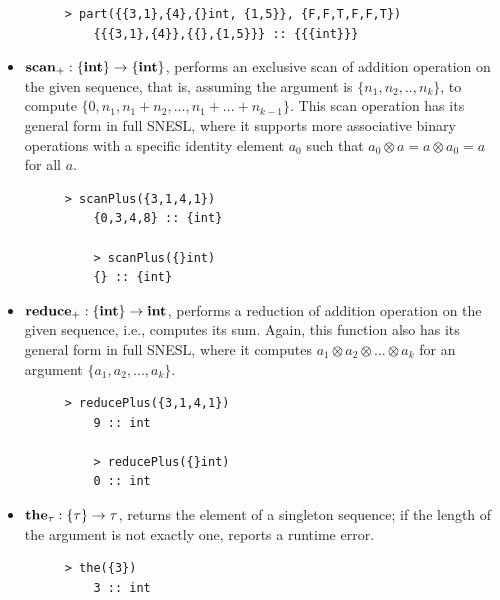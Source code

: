 \begin{itemize}
\begin{figure}[H]
\begin{lstlisting}[style = nesl-style]
	> part({{3,1},{4},{}int, {1,5}}, {F,F,T,F,F,T})
	{{{3,1},{4}},{{},{1,5}}} :: {{{int}}}
	\end{lstlisting}
	\end{figure}
	
	\item $\mathbf{scan_+}: \{\mathbf{int}\} \rightarrow \{\mathbf{int}\}$, performs an exclusive scan of addition operation on the given sequence, that is, assuming the argument is $\{n_1,n_2,..,n_k\}$, to compute $\{0, n_1,n_1+n_2,...,n_1+...+n_{k-1}\}$. This scan operation has its general form in full SNESL, where it supports more associative binary operations with a specific identity element $a_0$  such that $a_0 \otimes a = a \otimes a_0 = a$ for all $a$.
	\begin{figure}[H]
	\begin{example}
	\end{example}
	\begin{lstlisting}[style = nesl-style]
	> scanPlus({3,1,4,1})
	{0,3,4,8} :: {int}
	
	> scanPlus({}int)
	{} :: {int}
	\end{lstlisting}
	\end{figure}
	
	\item $\mathbf{reduce_+: \{\mathbf{int}\} \rightarrow \mathbf{int} }$, performs a reduction of addition operation on the given sequence, i.e., computes its sum. 
	Again, this function also has its general form in full SNESL, where it computes $a_1 \otimes a_2 \otimes... \otimes a_k $ for an argument $\{a_1,a_2,...,a_k\}$.
	\begin{figure}[H]
	\begin{example}
	\end{example}
	\begin{lstlisting}[style = nesl-style]
	> reducePlus({3,1,4,1})
	9 :: int
	
	> reducePlus({}int)
	0 :: int
	\end{lstlisting}
	\end{figure}


	\item $\mathbf{the_{\tau}:  \{\tau\} \rightarrow \tau}$, returns the element of a singleton sequence; if the length of the argument is not exactly one, reports a runtime error. 
	\begin{figure}[H]
	\begin{example}
	\end{example}
	\begin{lstlisting}[style = nesl-style]
	> the({3})
	3 :: int
	

\end{lstlisting}
\end{figure}
\end{itemize}

